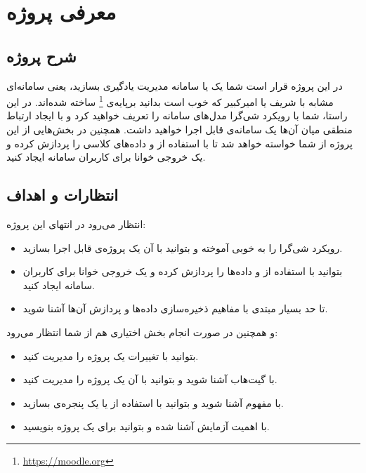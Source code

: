 \chapter{معرفی پروژه}
\section{شرح پروژه}

در این پروژه قرار است شما یک  یا سامانه مدیریت یادگیری بسازید، یعنی سامانه‌ای مشابه با  شریف یا  امیرکبیر که خوب است بدانید برپایه‌ی \footnote{\href{https://moodle.org}{\url{https://moodle.org}}} ساخته شده‌اند. 
در این راستا، شما با رویکرد شی‌گرا مدل‌های سامانه را تعریف خواهید کرد و با ایجاد ارتباط منطقی میان آن‌ها یک سامانه‌ی قابل اجرا خواهید داشت. همچنین در بخش‌هایی از این پروژه از شما خواسته خواهد شد تا با استفاده از  و  داده‌های کلاسی را پردازش کرده و یک خروجی خوانا برای کاربران سامانه ایجاد کنید.

\section{انتظارات و اهداف}

انتظار می‌رود در انتهای این پروژه:

\begin{itemize}
    \item {
        رویکرد شی‌گرا را به خوبی آموخته و بتوانید با آن یک پروژه‌ی قابل اجرا بسازید.
    }
    \item {
        بتوانید با استفاده از  و  داده‌ها را پردازش کرده و یک خروجی خوانا برای کاربران سامانه ایجاد کنید.
    }
    \item {
        تا حد بسیار مبتدی با مفاهیم ذخیره‌سازی داده‌ها و پردازش آن‌ها آشنا شوید.
    }
\end{itemize}
\noindent
و همچنین در صورت انجام بخش اختیاری هم از شما انتظار می‌رود:

\begin{itemize}
    \item {
        بتوانید با  تغییرات یک پروژه را مدیریت کنید.
    }
    \item {
        با گیت‌هاب آشنا شوید و بتوانید با آن یک پروژه را مدیریت کنید.
    }
    \item {
        با مفهوم  آشنا شوید و بتوانید با استفاده از  یا  یک پنجره‌ی  بسازید.
    }
    \item {
        با اهمیت آزمایش آشنا شده و بتوانید برای یک پروژه  بنویسید.
    }
\end{itemize}

